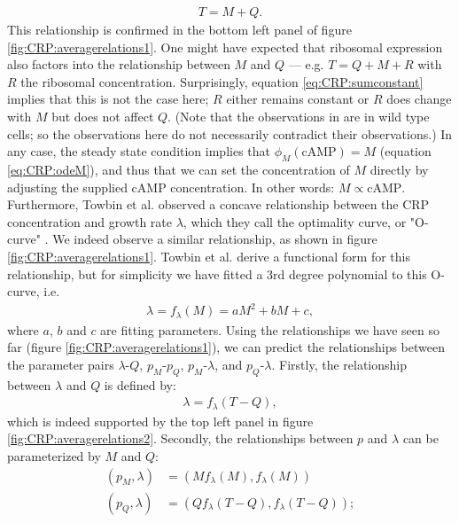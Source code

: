 \begin{align}
	\label{eq:CRP:sumconstant}	
	T = M + Q
	.
\end{align}
This relationship is confirmed in the bottom left panel of figure \ref{fig:CRP:averagerelations1}. 
One might have expected that ribosomal expression also factors into the relationship between $M$ and $Q$ --- e.g. $T=Q+M+R$ with $R$ the ribosomal concentration.
Surprisingly, equation \ref{eq:CRP:sumconstant} implies that this is not the case here; $R$ either remains constant or $R$ does change with $M$ but does not affect $Q$.
%
(Note that the observations in \cite{You2013} are in wild type cells; so the observations here do not necessarily contradict their observations.)
%
In any case, the steady state condition implies that $\phi_M(\text{cAMP}) = M$ (equation \ref{eq:CRP:odeM}), and thus that we can set the concentration of $M$ directly by adjusting the supplied cAMP concentration.
In other words: $M \propto \text{cAMP}$.
Furthermore, Towbin et al. observed a concave relationship between the CRP concentration and growth rate $\lambda$, which they call the optimality curve, or "O-curve" \cite{Towbin2017}.
We indeed observe a similar relationship, as shown in figure \ref{fig:CRP:averagerelations1}. 
Towbin et al. derive a functional form for this relationship, but for simplicity we have fitted a 3rd degree polynomial to this O-curve, i.e.
\begin{align}
	\label{eq:CRP:muwithCRP}	
	\lambda = f_\lambda(M) = a M^2 + b M + c
	,
\end{align}
where $a$, $b$ and $c$ are fitting parameters.
%
Using the relationships we have seen so far (figure \ref{fig:CRP:averagerelations1}), 
we can predict the relationships between the parameter pairs 
$\lambda\text{-}Q$, $p_M\text{-}p_Q$, $p_M\text{-}\lambda$, and $p_Q\text{-}\lambda$.
%
Firstly, the relationship between $\lambda$ and $Q$ is defined by: 
\begin{align}
	\label{eq:CRP:muwithQ}	
	\lambda = f_\lambda(T-Q)
	,
\end{align}
which is indeed supported by the top left panel in figure \ref{fig:CRP:averagerelations2}.
%
Secondly, the relationships between $p$ and $\lambda$ can be parameterized by $M$ and $Q$: 
\begin{align}
	\label{eq:CRP:pmu}	
	\left(p_M, \lambda\right) & = \left(M f_\lambda(M), f_\lambda(M)\right) \nonumber \\ 
	\left(p_Q, \lambda\right) & = \left(Q f_\lambda(T-Q), f_\lambda(T-Q)\right)
	;
\end{align}
